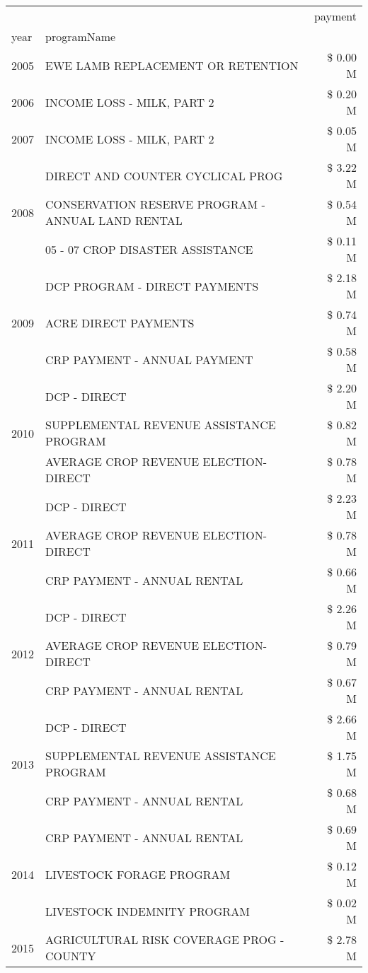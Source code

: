 \begin{tabular}{llr}
\toprule
 &  & payment \\
year & programName &  \\
\midrule
2005 & EWE LAMB REPLACEMENT OR RETENTION & \$ 0.00 M \\
\cline{1-3}
2006 & INCOME LOSS - MILK, PART 2 & \$ 0.20 M \\
\cline{1-3}
2007 & INCOME LOSS - MILK, PART 2 & \$ 0.05 M \\
\cline{1-3}
\multirow[t]{3}{*}{2008} & DIRECT AND COUNTER CYCLICAL PROG & \$ 3.22 M \\
 & CONSERVATION RESERVE PROGRAM - ANNUAL LAND RENTAL & \$ 0.54 M \\
 & 05 - 07 CROP DISASTER ASSISTANCE & \$ 0.11 M \\
\cline{1-3}
\multirow[t]{3}{*}{2009} & DCP PROGRAM - DIRECT PAYMENTS & \$ 2.18 M \\
 & ACRE DIRECT PAYMENTS & \$ 0.74 M \\
 & CRP PAYMENT - ANNUAL PAYMENT & \$ 0.58 M \\
\cline{1-3}
\multirow[t]{3}{*}{2010} & DCP - DIRECT & \$ 2.20 M \\
 & SUPPLEMENTAL REVENUE ASSISTANCE PROGRAM & \$ 0.82 M \\
 & AVERAGE CROP REVENUE ELECTION-DIRECT & \$ 0.78 M \\
\cline{1-3}
\multirow[t]{3}{*}{2011} & DCP - DIRECT & \$ 2.23 M \\
 & AVERAGE CROP REVENUE ELECTION-DIRECT & \$ 0.78 M \\
 & CRP PAYMENT - ANNUAL RENTAL & \$ 0.66 M \\
\cline{1-3}
\multirow[t]{3}{*}{2012} & DCP - DIRECT & \$ 2.26 M \\
 & AVERAGE CROP REVENUE ELECTION-DIRECT & \$ 0.79 M \\
 & CRP PAYMENT - ANNUAL RENTAL & \$ 0.67 M \\
\cline{1-3}
\multirow[t]{3}{*}{2013} & DCP - DIRECT & \$ 2.66 M \\
 & SUPPLEMENTAL REVENUE ASSISTANCE PROGRAM & \$ 1.75 M \\
 & CRP PAYMENT - ANNUAL RENTAL & \$ 0.68 M \\
\cline{1-3}
\multirow[t]{3}{*}{2014} & CRP PAYMENT - ANNUAL RENTAL & \$ 0.69 M \\
 & LIVESTOCK FORAGE PROGRAM & \$ 0.12 M \\
 & LIVESTOCK INDEMNITY PROGRAM & \$ 0.02 M \\
\cline{1-3}
\multirow[t]{3}{*}{2015} & AGRICULTURAL RISK COVERAGE PROG - COUNTY & \$ 2.78 M \\

\end{tabular}
